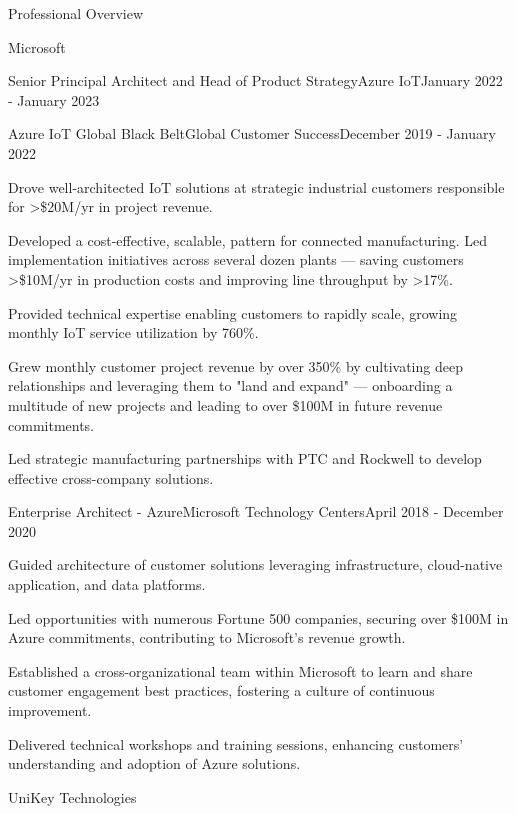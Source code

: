 \documentclass{resume} %
\begin{document}
\begin{rSection}{Professional Overview}
\begin{rCompany}{Microsoft}{}{}
\begin{rSubSubsection}{Senior Principal Architect and Head of Product Strategy}{Azure IoT}{January 2022 - January 2023}
    \end{rSubSubsection}
    
    \begin{rSubSubsection}{Azure IoT Global Black Belt}{Global Customer Success}{December 2019 - January 2022}
        \item Drove well-architected IoT solutions at strategic industrial customers responsible for >\$20M/yr in project revenue. 
        \item Developed a cost-effective, scalable, pattern for connected manufacturing. Led implementation initiatives across several dozen plants --- saving customers >\$10M/yr in production costs and improving line throughput by >17\%. 
        \item Provided technical expertise enabling customers to rapidly scale, growing monthly IoT service utilization by 760\%.
        \item Grew monthly customer project revenue by over 350\% by cultivating deep relationships and leveraging them to "land and expand" --- onboarding a multitude of new projects and leading to over \$100M in future revenue commitments.\
        \item Led strategic manufacturing partnerships with PTC and Rockwell to develop effective cross-company solutions.
    \end{rSubSubsection}
    
    \begin{rSubSubsection}{Enterprise Architect - Azure}{Microsoft Technology Centers}{April 2018 - December 2020}
        \item Guided architecture of customer solutions leveraging infrastructure, cloud-native application, and data platforms.
        \item Led opportunities with numerous Fortune 500 companies, securing over \$100M in Azure commitments, contributing to Microsoft's revenue growth.
        \item Established a cross-organizational team within Microsoft to learn and share customer engagement best practices, fostering a culture of continuous improvement.
        \item Delivered technical workshops and training sessions, enhancing customers' understanding and adoption of Azure solutions.
    \end{rSubSubsection}
  \end{rCompany}

  \begin{rCompany}{UniKey Technologies}{}{}


\end{rCompany}
\end{rSection}
\end{document}
